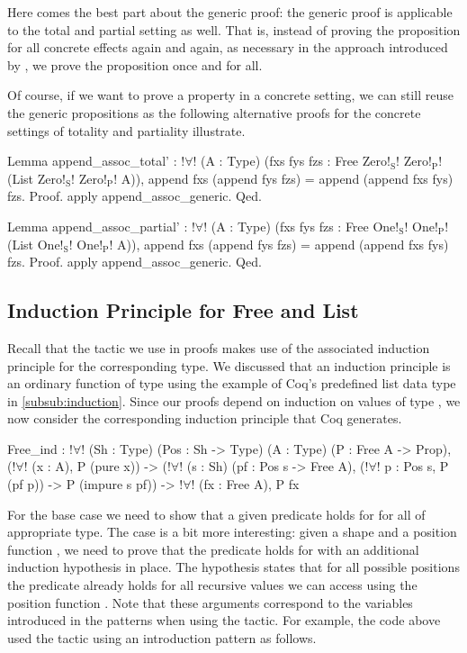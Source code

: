 Here comes the best part about the generic proof: the generic proof is applicable to the total and partial setting as well.
That is, instead of proving the proposition for all concrete effects again and again, as necessary in the approach introduced by \citet{abel2005verifying}, we prove the proposition once and for all.

Of course, if we want to prove a property in a concrete setting, we can still reuse the generic propositions as the following alternative proofs for the concrete settings of totality and partiality illustrate.

\begin{coqcode}
Lemma append_assoc_total' :
 !$\forall$! (A : Type) (fxs fys fzs : Free Zero!$_\text{S}$! Zero!$_\text{P}$! (List Zero!$_\text{S}$! Zero!$_\text{P}$! A)),
   append fxs (append fys fzs) = append (append fxs fys) fzs.
Proof.
 apply append_assoc_generic.
Qed.

Lemma append_assoc_partial' :
 !$\forall$! (A : Type) (fxs fys fzs : Free One!$_\text{S}$! One!$_\text{P}$! (List One!$_\text{S}$! One!$_\text{P}$! A)),
   append fxs (append fys fzs) = append (append fxs fys) fzs.
Proof.
 apply append_assoc_generic.
Qed.
\end{coqcode}

\subsection{Induction Principle for Free and List}

Recall that the  tactic we use in proofs makes use of the associated induction principle for the corresponding type.
We discussed that an induction principle is an ordinary function of type  using the example of Coq's predefined list data type in \autoref{subsub:induction}.
Since our proofs depend on induction on values of type , we now consider the corresponding induction principle that Coq generates.

\begin{coqcode}
Free_ind : !$\forall$! (Sh : Type) (Pos : Sh -> Type) (A : Type) (P : Free A -> Prop),
   (!$\forall$! (x : A), P (pure x)) ->
   (!$\forall$! (s : Sh) (pf : Pos s -> Free A),
     (!$\forall$! p : Pos s, P (pf p)) -> P (impure s pf)) ->
   !$\forall$! (fx : Free A), P fx
\end{coqcode}

For the base case we need to show that a given predicate  holds for  for all  of appropriate type.
The  case is a bit more interesting: given a shape  and a position function , we need to prove that the predicate holds for  with an additional induction hypothesis in place.
The hypothesis states that for all possible positions  the predicate already holds for all recursive values we can access using the position function .
Note that these arguments correspond to the variables introduced in the patterns when using the  tactic.
For example, the code above used the tactic using an introduction pattern as follows.

